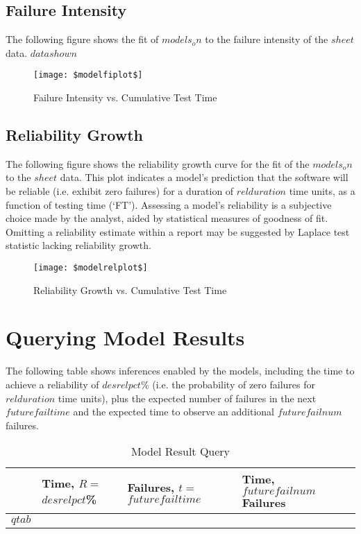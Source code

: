 \documentclass{article}
\begin{document}
\newpage

\subsection{Failure Intensity}
The following figure shows the fit of $models_on$ to the failure intensity of the $sheet$ data. $datashown$

\begin{figure}[h!]
\centering
\texttt{[image: \$modelfiplot\$]}
\caption{Failure Intensity vs. Cumulative Test Time}
\label{fig:mfiplot}
\end{figure}



\newpage

\subsection{Reliability Growth}
The following figure shows the reliability growth curve for the fit of the $models_on$ to the $sheet$ data. This plot indicates a model's prediction that the software will be reliable (i.e. exhibit zero failures) for a duration of $relduration$ time units, as a function of testing time (`FT'). Assessing a model's reliability is a subjective choice made by the analyst, aided by statistical measures of goodness of fit. Omitting a reliability estimate within a report may be suggested by Laplace test statistic lacking reliability growth.

\begin{figure}[h!]
\centering
\texttt{[image: \$modelrelplot\$]}
\caption{Reliability Growth vs. Cumulative Test Time}
\label{fig:relplot}
\end{figure}


\newpage


\section{Querying Model Results}
The following table shows inferences enabled by the models, including the time to achieve a reliability of $desrelpct$\% (i.e. the probability of zero failures for $relduration$ time units), plus the expected number of failures in the next $futurefailtime$ and the expected time to observe an additional $futurefailnum$ failures.


\begin{table}[h!]
\centering
\caption{Model Result Query}
\begin{tabular}{llll}
\hline
   & Time, $R=$ $desrelpct$\% & Failures, $t =$ $futurefailtime$  & Time, $futurefailnum$ Failures \\ \hline
$qtab$
\hline
\end{tabular}
\end{table}
\end{document}
